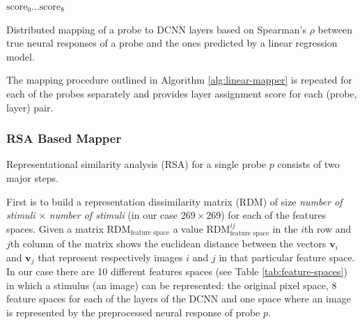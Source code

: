 \documentclass[final]{jneurosci}
\begin{document}
\vspace{1em}
\begin{algorithm}[H]
    
    \Return $\text{score}_0\ldots\text{score}_8$\;
    \ 
 
\caption{Distributed mapping of a probe to DCNN layers based on Spearman's $\rho$ between true neural responses of a probe and the ones predicted by a linear regression model.}
\label{alg:linear-mapper}
\end{algorithm}
\vspace{1em}

The mapping procedure outlined in Algorithm \ref{alg:linear-mapper} is repeated for each of the probes separately and provides layer assignment score for each (probe, layer) pair.

\subsubsection{RSA Based Mapper}
Representational similarity analysis (RSA) for a single probe $p$ consists of two major steps.

First is to build a representation dissimilarity matrix (RDM) of size \emph{number of stimuli} $\times$ \emph{number of stimuli} (in our case $269 \times 269$) for each of the features spaces. Given a matrix $\text{RDM}_\text{feature space}$ a value $\text{RDM}^{ij}_\text{feature space}$ in the $i$th row and $j$th column of the matrix shows the euclidean distance between the vectors $\mathbf{v}_i$ and $\mathbf{v}_j$ that represent respectively images $i$ and $j$ in that particular feature space. In our case there are 10 different features spaces (see Table \ref{tab:feature-spaces}) in which a stimulus (an image) can be represented: the original pixel space, 8 feature spaces for each of the layers of the DCNN and one space where an image is represented by the preprocessed neural response of probe $p$.
\end{document}
